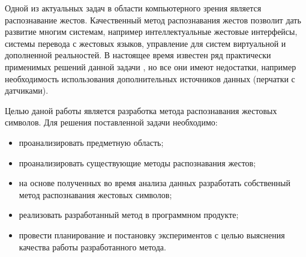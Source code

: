 \Introduction

Одной из актуальных задач в области компьютерного зрения является распознавание жестов. Качественный метод распознавания жестов позволит дать развитие многим системам, например интеллектуальные жестовые интерфейсы, системы перевода с жестовых языков, управление для систем виртуальной и дополненной реальностей. В настоящее время известен ряд практически применимых решений данной задачи \cite{Suharjito}, но все они имеют недостатки, например необходимость использования дополнительных источников данных (перчатки с датчиками).

Целью даной работы является разработка метода распознавания жестовых символов. Для решения поставленной задачи необходимо:

\begin{itemize}
	\item проанализировать предметную область;
	\item проанализировать существующие методы распознавания жестов;
	\item на основе полученных во время анализа данных разработать собственный метод распознавания жестовых символов;
	\item реализовать разработанный метод в программном продукте;
	\item провести планирование и постановку экспериментов с целью выяснения качества работы разработанного метода.
\end{itemize}